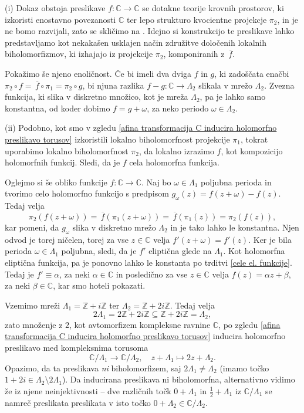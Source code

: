\documentclass[mat1]{fmfdelo}
\numberwithin{equation}{section}
\newcommand{\Z}{\mathbb Z}
\newcommand{\C}{\mathbb C}
\newcommand{\om}{\omega}
\newcommand{\olsi}[1]{\,\overline{\!{#1}}} %
\theoremstyle{definition}
\begin{document}
\begin{dokaz}
    (i) Dokaz obstoja preslikave $f : \C \to \C$ se dotakne teorije krovnih prostorov, ki izkoristi enostavno povezanosti $\C$ ter lepo strukturo kvocientne projekcje $\pi_2$, in je ne bomo razvijali, zato se skličimo na \cite[Lema 3.1]{Stevenhagen}. Idejno si konstrukcijo te preslikave lahko predstavljamo kot nekakašen usklajen način združitve določenih lokalnih biholomorfizmov, ki izhajajo iz projekcije $\pi_2$, komponiranih z $\olsi{f}$.

    Pokažimo še njeno enoličnost. Če bi imeli dva dviga $f$ in $g$, ki zadoščata enačbi $\pi_2 \circ f = \olsi{f} \circ \pi_1 = \pi_2 \circ g$, bi njuna razlika $f - g : \C \to \Lambda_2$ slikala v mrežo $\Lambda_2$. Zvezna funkcija, ki slika v diskretno množico, kot je mreža $\Lambda_2$, pa je lahko samo konstantna, od koder dobimo $f = g + \om$, za neko periodo $\om \in \Lambda_2$.

    (ii) Podobno, kot smo v zgledu \ref{afina transformacija C inducira holomorfno preslikavo torusov} izkoristili lokalno biholomorfnost projekcije $\pi_1$, tokrat uporabimo lokalno biholomorfnost $\pi_2$, da lokalno izrazimo $f$, kot kompozicijo holomorfnih funkcij. Sledi, da je $f$ cela holomorfna funkcija. 

    Oglejmo si še obliko funkcije $f : \C \to \C$. Naj bo $\om \in \Lambda_1$ poljubna perioda in tvorimo celo holomorfno funkcijo s predpisom $g_\om(z) = f(z + \om) - f(z)$. Tedaj velja
    \[
        \pi_2(f(z + \om)) = \olsi{f}(\pi_1(z + \om)) = 
        \olsi{f}(\pi_1(z)) = \pi_2(f(z)),
    \] 
    kar pomeni, da $g_\om$ slika v diskretno mrežo $\Lambda_2$ in je tako lahko le konstantna. Njen odvod je torej ničelen, torej za vse $z \in \C$ velja $f'(z + \om) = f'(z)$. Ker je bila perioda $\om \in \Lambda_1$ poljubna, sledi, da je $f'$ eliptična glede na $\Lambda_1$. Kot holomorfna eliptična funkcija, pa je ponovno lahko le konstanta po trditvi \ref{cele el. funkcije}. Tedaj je $f' \equiv \alpha$, za neki $\alpha \in \C$ in posledično za vse $z \in \C$ velja $f(z) = \alpha z + \beta$, za neki $\beta \in \C$, kar smo hoteli pokazati. 
\end{dokaz}

\begin{primer*}
    Vzemimo mreži $\Lambda_1 = \Z + i\Z$ ter $\Lambda_2 = \Z + 2i\Z$. Tedaj velja 
    \[
        2\Lambda_1 = 2\Z + 2i\Z \subseteq \Z + 2i\Z = \Lambda_2, 
    \]
    zato množenje z $2$, kot avtomorfizem kompleksne ravnine $\C$, po zgledu \ref{afina transformacija C inducira holomorfno preslikavo torusov} inducira holomorfno preslikavo med kompleksnima torusoma
    \[
        \C/\Lambda_1 \to \C/\Lambda_2, \quad z + \Lambda_1 \mapsto 2z + \Lambda_2.
    \]
    Opazimo, da ta preslikava \emph{ni} biholomorfizem, saj $2\Lambda_1 \neq \Lambda_2$ (imamo točko $1 + 2i \in \Lambda_2 \setminus 2\Lambda_1$). Da inducirana preslikava ni biholomorfna, alternativno vidimo že iz njene neinjektivnosti -- dve različnih točk $0 + \Lambda_1$ in $\frac12 + \Lambda_1$ iz $\C/\Lambda_1$ se namreč preslikata preslikata v isto točko $0 + \Lambda_2 \in \C/\Lambda_2$.  
    
\end{primer*}
\end{document}
